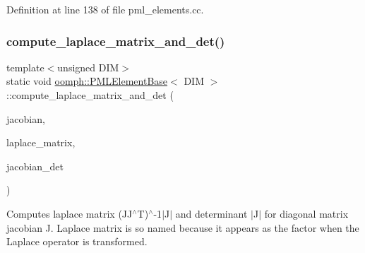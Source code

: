 Definition at line 138 of file pml\+\_\+elements.\+cc.

\mbox{\label{classoomph_1_1PMLElementBase_a3ce714da2e70d7237265f240ad0e0aaa}} 
\subsubsection{\texorpdfstring{compute\+\_\+laplace\+\_\+matrix\+\_\+and\+\_\+det()}{compute\_laplace\_matrix\_and\_det()}\hspace{0.1cm}{\footnotesize\ttfamily [8/12]}}
{\footnotesize\ttfamily template$<$unsigned D\+IM$>$ \\
static void \hyperlink{classoomph_1_1PMLElementBase}{oomph\+::\+P\+M\+L\+Element\+Base}$<$ D\+IM $>$\+::compute\+\_\+laplace\+\_\+matrix\+\_\+and\+\_\+det (\begin{DoxyParamCaption}\item[{const \hyperlink{classoomph_1_1DiagonalComplexMatrix}{Diagonal\+Complex\+Matrix} \&}]{jacobian,  }\item[{\hyperlink{classoomph_1_1DenseComplexMatrix}{Dense\+Complex\+Matrix} \&}]{laplace\+\_\+matrix,  }\item[{std\+::complex$<$ double $>$ \&}]{jacobian\+\_\+det }\end{DoxyParamCaption})\hspace{0.3cm}{\ttfamily [static]}}



Computes laplace matrix (J\+J$^\wedge$T)$^\wedge$-\/1$\vert$\+J$\vert$ and determinant $\vert$\+J$\vert$ for diagonal matrix jacobian J. Laplace matrix is so named because it appears as the factor when the Laplace operator is transformed. 

\mbox{\label{classoomph_1_1PMLElementBase_a9df56eb6843f56183ebbd71808916964}} 
